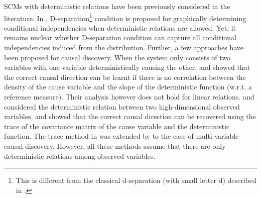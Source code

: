 \documentclass[12pt]{article}
\begin{document}
SCMs with deterministic relations have been previously considered in the literature. In \citep{geiger1990identifying, spirtes2000causation}, D-separation\footnote{This is different from the classical d-separation (with small letter d) described in \citep[Section 1.2]{pearl2009causality}.} condition is proposed for graphically determining conditional independencies when deterministic relations are allowed. Yet, it remains unclear whether D-separation condition can capture all conditional independencies induced from the distribution.
Further, a few approaches have been proposed for causal discovery. When the system only consists of two variables with one variable deterministically causing the other, \citet{daniusis2012inferring} and \citet{janzing2012information} showed that the correct causal direction can be learnt if there is no correlation between the density of the cause variable and the slope of the deterministic function (w.r.t. a reference measure). Their analysis however does not hold for linear relations. \citet{janzing2010telling} and \citet{chen2013nonlinear} considered the deterministic relation between two high-dimensional observed variables, and showed that the correct causal direction can be recovered using the trace of the covariance matrix of the cause variable and the deterministic function. The trace method in \citep{chen2013nonlinear} was extended by \citep{zeng2021nonlinear} to the case of multi-variable causal discovery. However, all these methods assume that  
there are only deterministic relations among observed variables.
\end{document}
